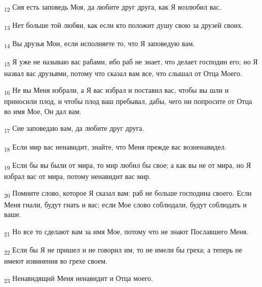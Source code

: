 \begin{tcolorbox}
\textsubscript{12} Сия есть заповедь Моя, да любите друг друга, как Я возлюбил вас.
\end{tcolorbox}
\begin{tcolorbox}
\textsubscript{13} Нет больше той любви, как если кто положит душу свою за друзей своих.
\end{tcolorbox}
\begin{tcolorbox}
\textsubscript{14} Вы друзья Мои, если исполняете то, что Я заповедую вам.
\end{tcolorbox}
\begin{tcolorbox}
\textsubscript{15} Я уже не называю вас рабами, ибо раб не знает, что делает господин его; но Я назвал вас друзьями, потому что сказал вам все, что слышал от Отца Моего.
\end{tcolorbox}
\begin{tcolorbox}
\textsubscript{16} Не вы Меня избрали, а Я вас избрал и поставил вас, чтобы вы шли и приносили плод, и чтобы плод ваш пребывал, дабы, чего ни попросите от Отца во имя Мое, Он дал вам.
\end{tcolorbox}
\begin{tcolorbox}
\textsubscript{17} Сие заповедаю вам, да любите друг друга.
\end{tcolorbox}
\begin{tcolorbox}
\textsubscript{18} Если мир вас ненавидит, знайте, что Меня прежде вас возненавидел.
\end{tcolorbox}
\begin{tcolorbox}
\textsubscript{19} Если бы вы были от мира, то мир любил бы свое; а как вы не от мира, но Я избрал вас от мира, потому ненавидит вас мир.
\end{tcolorbox}
\begin{tcolorbox}
\textsubscript{20} Помните слово, которое Я сказал вам: раб не больше господина своего. Если Меня гнали, будут гнать и вас; если Мое слово соблюдали, будут соблюдать и ваше.
\end{tcolorbox}
\begin{tcolorbox}
\textsubscript{21} Но все то сделают вам за имя Мое, потому что не знают Пославшего Меня.
\end{tcolorbox}
\begin{tcolorbox}
\textsubscript{22} Если бы Я не пришел и не говорил им, то не имели бы греха; а теперь не имеют извинения во грехе своем.
\end{tcolorbox}
\begin{tcolorbox}
\textsubscript{23} Ненавидящий Меня ненавидит и Отца моего.
\end{tcolorbox}
